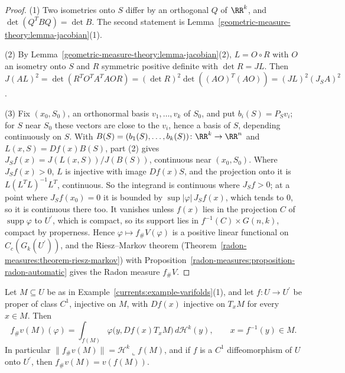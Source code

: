 \begin{proof}
(1) Two isometries onto $S$ differ by an orthogonal $Q$ of $\RR^k$, and $\det(Q^TBQ) = \det B$. The second statement is Lemma~\ref{geometric-measure-theory:lemma-jacobian}(1).

(2) By Lemma~\ref{geometric-measure-theory:lemma-jacobian}(2), $L = O \circ R$ with $O$ an isometry onto $S$ and $R$ symmetric positive definite with $\det R = JL$. Then
$J(AL)^2 = \det(R^TO^TA^TAOR) = (\det R)^2\det((AO)^T(AO)) = (JL)^2(J_SA)^2$.

(3) Fix $(x_0, S_0)$, an orthonormal basis $v_1, \ldots, v_k$ of $S_0$, and put $b_i(S) = P_Sv_i$; for $S$ near $S_0$ these vectors are close to the $v_i$, hence a basis of $S$, depending continuously on
$S$. With $B(S) = (b_1(S), \ldots, b_k(S)) \colon \RR^k \to \RR^n$ and $L(x, S) = Df(x)B(S)$, part (2) gives $J_Sf(x) = J(L(x, S))/J(B(S))$, continuous near $(x_0, S_0)$. Where $J_Sf(x) > 0$, $L$ is
injective with image $Df(x)S$, and the projection onto it is $L(L^TL)^{-1}L^T$, continuous. So the integrand is continuous where $J_Sf > 0$; at a point where $J_Sf(x_0) = 0$ it is bounded by
$\sup|\varphi|\,J_Sf(x)$, which tends to $0$, so it is continuous there too. It vanishes unless $f(x)$ lies in the projection $C$ of $\operatorname{supp}\varphi$ to $U^{\prime}$, which is compact, so its
support lies in $f^{-1}(C) \times G(n, k)$, compact by properness. Hence $\varphi \mapsto f_\#V(\varphi)$ is a positive linear functional on $C_c(G_k(U^{\prime}))$, and the Riesz--Markov theorem
(Theorem~\ref{radon-measures:theorem-riesz-markov}) with Proposition~\ref{radon-measures:proposition-radon-automatic} gives the Radon measure $f_\#V$.
\end{proof}

\begin{proposition}\label{currents:proposition-push-forward-submanifold}
Let $M \subseteq U$ be as in Example~\ref{currents:example-varifolds}(1), and let $f \colon U \to U^{\prime}$ be proper of class $C^1$, injective on $M$, with $Df(x)$ injective on $T_xM$ for every $x \in M$.
Then
\[
f_\#v(M)(\varphi) = \int_{f(M)}\varphi\bigl(y, Df(x)T_xM\bigr)\,d\mathcal{H}^k(y), \qquad x = f^{-1}(y) \in M .
\]
In particular $\|f_\#v(M)\| = \mathcal{H}^k\llcorner f(M)$, and if $f$ is a $C^1$ diffeomorphism of $U$ onto $U^{\prime}$, then $f_\#v(M) = v(f(M))$.
\end{proposition}

